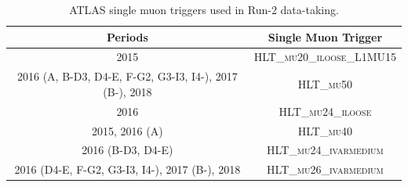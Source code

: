 \begin{table}

\footnotesize{
	\begin{center}
	\begin{tabular}{ c c}
		\toprule
			Periods & Single Muon Trigger \\
			\midrule
			2015 & \textsc{HLT\_mu20\_iloose\_L1MU15} \\
			\midrule
			2016 (A, B-D3, D4-E, F-G2, G3-I3, I4-), 2017 (B-), 2018 & \textsc{HLT\_mu50} \\
			\midrule
			2016 & \textsc{HLT\_mu24\_iloose} \\
			\midrule
			2015, 2016 (A) & \textsc{HLT\_mu40} \\
			\midrule
			2016 (B-D3, D4-E) & \textsc{HLT\_mu24\_ivarmedium} \\
			\midrule
			2016 (D4-E, F-G2, G3-I3, I4-), 2017 (B-), 2018  & \textsc{HLT\_mu26\_ivarmedium} \\
		\bottomrule
	\end{tabular}
	\end{center}
	}
  \caption{ATLAS single muon triggers used in Run-2 data-taking.}
  \label{tab:mu_trigs}
\end{table}



